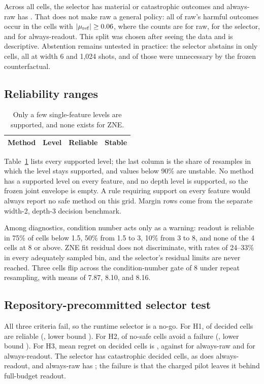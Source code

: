 \documentclass[10pt,twocolumn]{article}
\begin{document}
Across all cells, the selector has \SelectorHarm{} material or catastrophic outcomes and
always-raw has \AlwaysRawHarm{}. That does not make raw a general policy: all of raw's
harmful outcomes occur in the \StrongSignalCells{} cells with $|\mu_{\rm ref}|\geq0.06$,
where the counts are \StrongHarmRaw{} for raw, \StrongHarmSelector{} for the selector, and
\StrongHarmReadout{} for always-readout. This split was chosen after seeing the data and is
descriptive. Abstention remains untested in practice: the selector abstains in only
\SelectorAbstentions{} cells, all at width 6 and 1,024 shots, and \SelectorUnnecessaryAbstentions{}
of those were unnecessary by the frozen counterfactual.

\subsection{Reliability ranges}
\begin{table}[t]
\centering
\caption{Only a few single-feature levels are supported, and none exists for ZNE.}
\label{tab:envelope}
\small
\begin{tabular}{llrr}
\toprule
Method & Level & Reliable & Stable\\
\midrule

\end{tabular}
\end{table}

Table~\ref{tab:envelope} lists every supported level; the last column is the share of
resamples in which the level stays supported, and values below 90\% are unstable. No method
has a supported level on every feature, and no depth level is supported, so the frozen joint
envelope is empty. A rule requiring support on every feature would always report no safe
method on this grid. Margin rows come from the separate width-2, depth-3 decision benchmark.

Among diagnostics, condition number acts only as a warning: readout is reliable in 75\% of
cells below 1.5, 50\% from 1.5 to 3, 10\% from 3 to 8, and none of the 4 cells at 8 or above.
ZNE fit residual does not discriminate, with rates of 24--33\% in every adequately sampled
bin, and the selector's residual limits are never reached. Three cells flip across the
condition-number gate of 8 under repeat resampling, with means of 7.87, 8.10, and 8.16.

\subsection{Repository-precommitted selector test}
All three criteria fail, so the runtime selector is a no-go. For H1, \VTwoReliableCells{} of
\VTwoDecidedCells{} decided cells are reliable (\VTwoHOneRate{}, lower bound \VTwoHOneLow{}). For
H2, \VTwoAvoidedCells{} of \VTwoNoSafeCells{} no-safe cells avoid a failure (\VTwoHTwoRate{},
lower bound \VTwoHTwoLow{}). For H3, mean regret on decided cells is \VTwoRegretSelector{},
against \VTwoRegretRaw{} for always-raw and \VTwoRegretReadout{} for always-readout. The selector
has \VTwoCatastrophicSelector{} catastrophic decided cells, as does always-readout, and always-raw
has \VTwoCatastrophicRaw{}; the failure is that the charged pilot leaves it behind full-budget
readout.
\end{document}
